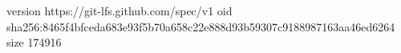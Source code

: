 version https://git-lfs.github.com/spec/v1
oid sha256:8465f4bfceda683e93f5b70a658c22e888d93b59307c9188987163aa46ed6264
size 174916
